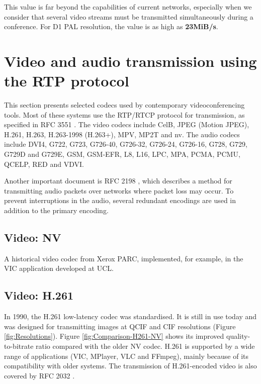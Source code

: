 This value is far beyond the capabilities of current networks, especially when we consider that several video streams must be transmitted simultaneously during a conference. For D1 PAL resolution, the value is as high as \textbf{23MiB/s}.

\section{Video and audio transmission using the RTP protocol}

This section presents selected codecs used by contemporary videoconferencing tools. Most of these systems use the RTP/RTCP protocol for transmission, as specified in RFC 3551 \cite{RFC-3551-RTP-Profile-AudioVideo}. The video codecs include CelB, JPEG (Motion JPEG), H.261, H.263, H.263-1998 (H.263+), MPV, MP2T and nv. The audio codecs include DVI4, G722, G723, G726-40, G726-32, G726-24, G726-16, G728, G729, G729D and G729E, GSM, GSM-EFR, L8, L16, LPC, MPA, PCMA, PCMU, QCELP, RED and VDVI.

Another important document is RFC 2198 \cite{RFC-2198-RTP-Payload-Redundant-Audio}, which describes a method for transmitting audio packets over networks where packet loss may occur. To prevent interruptions in the audio, several redundant encodings are used in addition to the primary encoding.

\subsection{Video: NV}\label{kap:NV}
A historical video codec from Xerox PARC, implemented, for example, in the VIC application developed at UCL.

\subsection{Video: H.261}\label{kap:H.261}
In 1990, the H.261 low-latency codec was standardised. It is still in use today and was designed for transmitting images at QCIF and CIF resolutions (Figure \ref{fig:Resolutions}). Figure \ref{fig:Comparison-H261-NV} shows its improved quality-to-bitrate ratio compared with the older NV codec. H.261 is supported by a wide range of applications (VIC, MPlayer, VLC and FFmpeg), mainly because of its compatibility with older systems. The transmission of H.261-encoded video is also covered by RFC 2032 \cite{RFC-2032-RTP-Payload-Format-H.261}.

